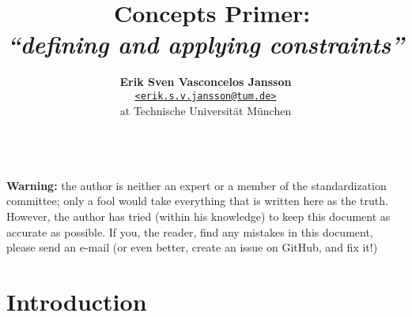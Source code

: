 \documentclass[a4paper, 11pt]{article}
\title{\vspace{-1.5em}\textbf{\Cpp\ Concepts Primer:}\\
       \large{\emph{``defining and applying constraints''}}}
\author{{\textbf{Erik Sven Vasconcelos Jansson}} \\
        {\href{mailto:erik.s.v.jansson@tum.de}
        {\texttt{<erik.s.v.jansson@tum.de>}}} \\
        {at Technische Universität München}}
\begin{document}
    \maketitle \begin{abstract}
    \end{abstract} \tableofcontents

    \mbox{} \\ \noindent \textbf{Warning:} the author is neither an expert or a member of the standardization committee; only a fool would take everything that is written here as the truth. However, the author has tried (within his knowledge) to keep this document as accurate as possible. If you, the reader, find any mistakes in this document, please send an e-mail (or even better, create an issue on GitHub, and fix it!) \mbox{}  \thispagestyle{empty} \newpage {}

    \section{Introduction} \label{sec:introduction} 

    \newpage
    \nocite{*} %
    
    
    \newpage \appendix
\end{document}
